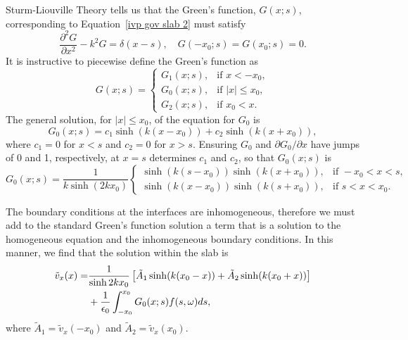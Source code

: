 Sturm-Liouville Theory tells us that the Green's function, $G(x;s)$, corresponding to Equation~\eqref{ivp gov slab 2} must satisfy 
\begin{equation}
\frac{\partial^2G}{\partial x^2} - k^2 G = \delta(x - s), \quad G(-x_0; s) = G(x_0; s) = 0.
\end{equation}
It is instructive to piecewise define the Green's function as
\begin{equation}
G(x; s) = 
\begin{cases}
G_1(x; s), & \text{if } x < -x_0, \\
G_0(x; s), & \text{if } |x| \leq x_0, \\
G_2(x; s), & \text{if } x_0 < x.
\end{cases}
\end{equation}
The general solution, for $|x| \leq x_0$, of the equation for $G_0$ is
\begin{equation}
G_0(x; s) = c_1\sinh(k(x - x_0)) + c_2\sinh(k(x + x_0)),
\end{equation}
where $c_1 = 0$ for $x < s$ and $c_2 = 0$ for $x > s$. Ensuring $G_0$ and $\partial G_0 / \partial x$ have jumps of 0 and 1, respectively, at $x = s$  determines $c_1$ and $c_2$, so that $G_0(x;s)$ is
\begin{equation}
G_0(x;s) = \frac{1}{k\sinh(2k x_0)}
\begin{cases}
\sinh(k(s - x_0))\sinh(k(x + x_0)), & \text{if } -x_0<x<s, \\
\sinh(k(x - x_0))\sinh(k(s + x_0)), & \text{if } s<x<x_0.
\end{cases}
\end{equation}

The boundary conditions at the interfaces are inhomogeneous, therefore we must add to the standard Green's function solution a term that is a solution to the homogeneous equation and the inhomogeneous boundary conditions. In this manner, we find that the solution within the slab is
\begin{align}
\tilde{v}_x(x) = &\frac{1}{\sinh{2kx_0}} \left[ \tilde{A}_1\sinh(k(x_0 - x)) + \tilde{A}_2\sinh(k(x_0 + x)) \right] \notag \\
&+ \frac{1}{\epsilon_0}\int_{-x_0}^{x_0} G_0(x;s) f(s, \omega) ds,
\label{sol 0}
\end{align}
where $\tilde{A}_1 = \tilde{v}_x(-x_0)$ and $\tilde{A}_2 = \tilde{v}_x(x_0)$.

